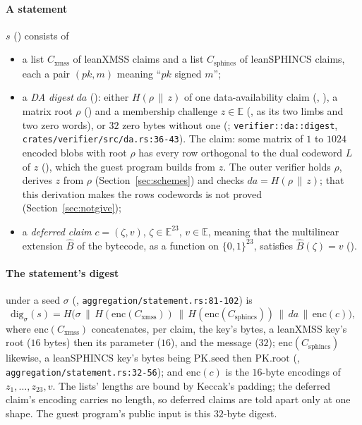 \documentclass[11pt]{article}
\newcommand{\Cx}{C_{\mathrm{xmss}}}
\newcommand{\Cs}{C_{\mathrm{sphincs}}}
\newcommand{\enc}{\mathrm{enc}}
\begin{document}
\paragraph{A statement} $s$ () consists of
\begin{itemize}
\item a list $\Cx$ of leanXMSS claims and a list $\Cs$ of leanSPHINCS claims, each a pair $(pk, m)$
meaning ``$pk$ signed $m$'';
\item a \emph{DA digest} $\mathit{da}$ (): either $H(\rho \,\|\, z)$ of one
data-availability claim (, ), a matrix root $\rho$
() and a membership challenge $z \in \mathbb{E}$ (, as its
two limbs and two zero words), or $32$ zero bytes without one (;
\texttt{verifier::da::digest}, \texttt{crates/verifier/src/da.rs:36-43}). The claim: some matrix of
$1$ to $1024$ encoded blobs with root $\rho$ has every row orthogonal to the dual codeword $L$ of $z$
(), which the guest program builds from $z$. The outer verifier holds
$\rho$, derives $z$ from $\rho$ (Section~\ref{sec:schemes}) and checks $\mathit{da} = H(\rho \,\|\, z)$; that
this derivation makes the rows codewords is not proved (Section~\ref{sec:notgive});
\item a \emph{deferred claim} $c = (\zeta, v)$, $\zeta \in \mathbb{E}^{23}$, $v \in \mathbb{E}$, meaning
that the multilinear extension $\widehat{B}$ of the bytecode, as a function on $\{0,1\}^{23}$,
satisfies $\widehat{B}(\zeta) = v$ ().
\end{itemize}

\paragraph{The statement's digest} under a seed $\sigma$ (,
\texttt{aggregation/statement.rs:81-102}) is
\[
\mathrm{dig}_\sigma(s) = H\big(\sigma \,\|\, H(\enc(\Cx)) \,\|\, H(\enc(\Cs)) \,\|\, \mathit{da} \,\|\, \enc(c)\big),
\]
where $\enc(\Cx)$ concatenates, per claim, the key's bytes, a leanXMSS key's root ($16$ bytes)
then its parameter ($16$), and the message ($32$); $\enc(\Cs)$ likewise, a leanSPHINCS key's bytes
being $\mathrm{PK.seed}$ then $\mathrm{PK.root}$ (,
\texttt{aggregation/statement.rs:32-56}); and $\enc(c)$ is the $16$-byte encodings of
$z_1, \dots, z_{23}, v$. The lists' lengths are bound by Keccak's padding;
the deferred claim's encoding carries no length, so deferred claims are told apart only at one
shape. The guest program's public input is this $32$-byte digest.
\end{document}

